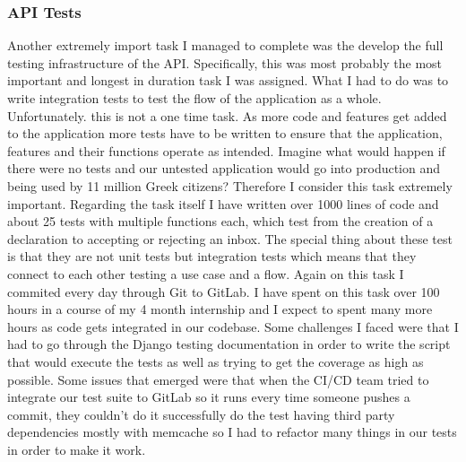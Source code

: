 \subsubsection{API Tests}
Another extremely import task I managed to complete was the develop the full testing infrastructure
of the API. Specifically, this was most probably the most important and longest in duration task I was
assigned. What I had to do was to write integration tests to test the flow of the application as a whole. Unfortunately. this is not a one time task. As more code and features get added to the application more tests have to be written to ensure that the application, features and their functions
operate as intended. Imagine what would happen if there were no tests and our untested application would go into production and being used by 11 million Greek citizens? Therefore I consider this task
extremely important. Regarding the task itself I have written over 1000 lines of code and about 25 tests with multiple functions each, which test from the creation of a declaration to accepting or rejecting an inbox. The special thing about these test is that they are not unit tests but integration tests which means that they connect to each other testing a use case and a flow. Again on this task I commited every day through Git to GitLab. I have spent on this task over 100 hours in a course of my 4 month internship and I expect to spent many more hours as code gets integrated in our codebase. Some challenges I faced were that I had to go through the Django testing documentation in order to write the script that would execute the tests as well as trying to get the coverage as high as possible. Some issues that emerged were that when the CI/CD team tried to integrate our test suite to GitLab so it runs every time someone pushes a commit, they couldn't do it successfully do the test having third party dependencies mostly with memcache so  I had to refactor many things in our tests in order to make it work.



